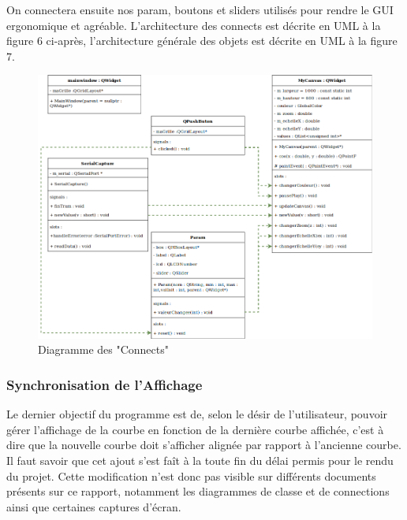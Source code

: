 \documentclass[11pt, french]{article}
\begin{document}
\vspace{3mm}

On connectera ensuite nos param, boutons et sliders utilisés pour rendre le GUI ergonomique et agréable. L'architecture des connects est décrite en UML à la figure 6 ci-après, l'architecture générale des objets est décrite en UML à la figure 7.

\newpage

\vspace*{0.1cm}
\begin{figure}[htb]
\centering
\includegraphics[width=17cm]{diagrammeconnect.png}
\caption{Diagramme des "Connects"}
\label{fig:classdiag}
\end{figure}
\vspace*{0.1cm}

\newpage

\subsubsection{Synchronisation de l'Affichage}

Le dernier objectif du programme est de, selon le désir de l’utilisateur, pouvoir gérer l’affichage de la courbe en fonction de la dernière courbe affichée, c’est à dire que la nouvelle courbe doit s’afficher alignée par rapport à l’ancienne courbe. \\

Il faut savoir que cet ajout s'est faît à la toute fin du délai permis pour le rendu du projet. Cette modification n'est donc pas visible sur différents documents présents sur ce rapport, notamment les diagrammes de classe et de connections ainsi que certaines captures d'écran.\\
\end{document}
